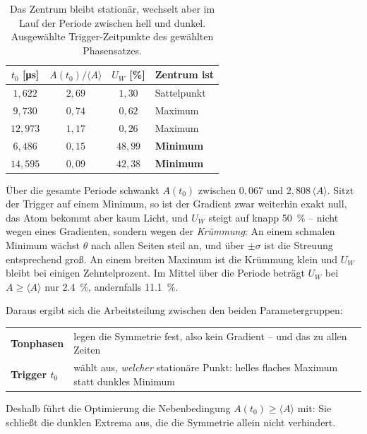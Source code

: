\documentclass[11pt,a4paper]{article}
\newcommand{\Uw}{\ensuremath{U_W}}
\begin{document}
\begin{table}[htb]
  \centering
  \caption{Das Zentrum bleibt stationär, wechselt aber im Lauf der Periode
  zwischen hell und dunkel. Ausgewählte Trigger-Zeitpunkte des gewählten
  Phasensatzes.}
  \label{tab:hell}
  \begin{tabular}{cccl}
    \toprule
    $t_0$ [\si{\micro\second}] & $A(t_0)/\langle A\rangle$ & $\Uw$ [\si{\percent}] & Zentrum ist\\
    \midrule
    $1{,}622$  & $2{,}69$ & $1{,}30$  & Sattelpunkt\\
    $9{,}730$  & $0{,}74$ & $0{,}62$  & Maximum\\
    $12{,}973$ & $1{,}17$ & $0{,}26$  & Maximum\\
    $6{,}486$  & $0{,}15$ & $48{,}99$ & \textbf{Minimum}\\
    $14{,}595$ & $0{,}09$ & $42{,}38$ & \textbf{Minimum}\\
    \bottomrule
  \end{tabular}
\end{table}

Über die gesamte Periode schwankt $A(t_0)$ zwischen $0{,}067$ und
$2{,}808\,\langle A\rangle$. Sitzt der Trigger auf einem Minimum, so ist der
Gradient zwar weiterhin exakt null, das Atom bekommt aber kaum Licht, und
$\Uw$ steigt auf knapp \SI{50}{\percent} -- nicht wegen eines Gradienten,
sondern wegen der \emph{Krümmung}: An einem schmalen Minimum wächst $\theta$
nach allen Seiten steil an, und über $\pm\sigma$ ist die Streuung
entsprechend groß. An einem breiten Maximum ist die Krümmung klein und $\Uw$
bleibt bei einigen Zehntelprozent. Im Mittel über die Periode beträgt $\Uw$
bei $A\ge\langle A\rangle$ nur \SI{2.4}{\percent}, andernfalls
\SI{11.1}{\percent}.

Daraus ergibt sich die Arbeitsteilung zwischen den beiden Parametergruppen:
\begin{center}
\begin{tabular}{@{}p{}p{}@{}}
  \toprule
  \textbf{Tonphasen} & legen die Symmetrie fest, also kein Gradient -- und
  das zu allen Zeiten\\
  \textbf{Trigger $t_0$} & wählt aus, \emph{welcher} stationäre Punkt: helles
  flaches Maximum statt dunkles Minimum\\
  \bottomrule
\end{tabular}
\end{center}
Deshalb führt die Optimierung die Nebenbedingung $A(t_0)\ge\langle A\rangle$
mit: Sie schließt die dunklen Extrema aus, die die Symmetrie allein nicht
verhindert.
\end{document}
